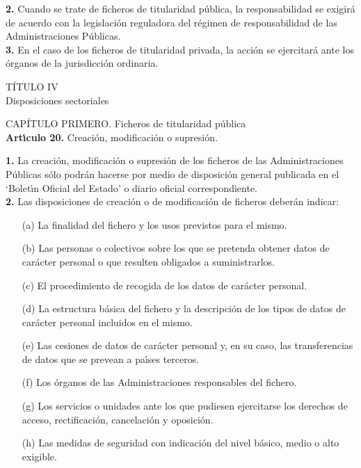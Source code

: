 {\bf 2.} Cuando se trate de ficheros de titularidad p\'ublica, la 
responsabilidad se exigir\'a de acuerdo con la legislaci\'on reguladora del 
r\'egimen de responsabilidad de las Administraciones P\'ublicas.\\

{\bf 3.} En el caso de los ficheros de titularidad privada, la acci\'on se 
ejercitar\'a ante los \'organos de la jurisdicci\'on ordinaria.
\begin{center}
{\LARGE T\'ITULO IV}\\
{\large Disposiciones sectoriales}
\end{center}
\vspace{0.3cm}
{\large CAP\'ITULO PRIMERO. Ficheros de titularidad p\'ublica}
\vspace{0.3cm}\\
{\large {\bf Art\'{\i}culo 20.} Creaci\'on, modificaci\'on o supresi\'on.}

{\bf 1.} La creaci\'on, modificaci\'on o supresi\'on de los ficheros de las 
Administraciones P\'ublicas s\'olo podr\'an hacerse por medio de disposici\'on 
general publicada en el `Bolet\'{\i}n Oficial del Estado' o diario oficial 
correspondiente.\\

{\bf 2.} Las disposiciones de creaci\'on o de modificaci\'on de ficheros 
deber\'an indicar:
\begin{itemize}
\item [(a)] La finalidad del fichero y los usos previstos para el mismo.
\item [(b)] Las personas o colectivos sobre los que se pretenda obtener datos 
de car\'acter personal o que resulten obligados a suministrarlos.
\item [(c)] El procedimiento de recogida de los datos de car\'acter personal.
\item [(d)] La estructura b\'asica del fichero y la descripci\'on de los tipos 
de datos de car\'acter personal incluidos en el mismo.
\item [(e)] Las cesiones de datos de car\'acter personal y, en su caso, las 
transferencias de datos que se prevean a pa\'{\i}ses terceros.
\item [(f)] Los \'organos de las Administraciones responsables del fichero.
\item [(g)] Los servicios o unidades ante los que pudiesen ejercitarse los 
derechos de acceso, rectificaci\'on, cancelaci\'on y oposici\'on.
\item [(h)] Las medidas de seguridad con indicaci\'on del nivel b\'asico, medio 
o alto exigible.
\end{itemize}

